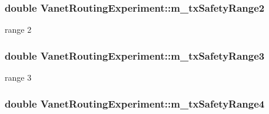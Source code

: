 \subsubsection[{\texorpdfstring{m\+\_\+tx\+Safety\+Range2}{m_txSafetyRange2}}]{\setlength{\rightskip}{0pt plus 5cm}double Vanet\+Routing\+Experiment\+::m\+\_\+tx\+Safety\+Range2\hspace{0.3cm}{\ttfamily [private]}}\hypertarget{classVanetRoutingExperiment_ae6eed15f9f0ce82f650c646e208e2c5e}{}\label{classVanetRoutingExperiment_ae6eed15f9f0ce82f650c646e208e2c5e}


range 2 

\subsubsection[{\texorpdfstring{m\+\_\+tx\+Safety\+Range3}{m_txSafetyRange3}}]{\setlength{\rightskip}{0pt plus 5cm}double Vanet\+Routing\+Experiment\+::m\+\_\+tx\+Safety\+Range3\hspace{0.3cm}{\ttfamily [private]}}\hypertarget{classVanetRoutingExperiment_a5d3559c0aebe92a46501b21b57a96fad}{}\label{classVanetRoutingExperiment_a5d3559c0aebe92a46501b21b57a96fad}


range 3 

\subsubsection[{\texorpdfstring{m\+\_\+tx\+Safety\+Range4}{m_txSafetyRange4}}]{\setlength{\rightskip}{0pt plus 5cm}double Vanet\+Routing\+Experiment\+::m\+\_\+tx\+Safety\+Range4\hspace{0.3cm}{\ttfamily [private]}}\hypertarget{classVanetRoutingExperiment_a9935d9bd1426b35bf7e5921f478034a9}{}\label{classVanetRoutingExperiment_a9935d9bd1426b35bf7e5921f478034a9}


